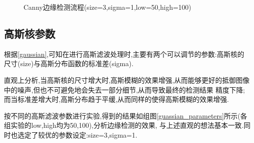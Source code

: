 \documentclass[a4paper]{article}
\begin{document}
\begin{figure}[H]
\caption{Canny边缘检测流程(size=3,sigma=1,low=50,high=100)}
\label{Fig.lable}
\end{figure}
    \subsection{高斯核参数}
根据\ref{gaussian},可知在进行高斯滤波处理时,主要有两个可以调节的参数:高斯核的尺寸(size)与高斯分布函数的标准差(sigma).

直观上分析,当高斯核的尺寸增大时,高斯模糊的效果增强,从而能够更好的抵御图像中的噪声,但也不可避免地会失去一部分细节,从而导致最终的检测结果
精度下降;而当标准差增大时,高斯分布趋于平缓,从而同样的使得高斯模糊的效果增强.

按不同的高斯滤波参数进行实验,得到的结果如组图\ref{guassian_parameters}所示(各组实验的low,high均为50,100),分析边缘检测的效果,
与上述直观的想法基本一致.同时也选定了较优的参数设定:size=3,sigma=1.
\end{document}
